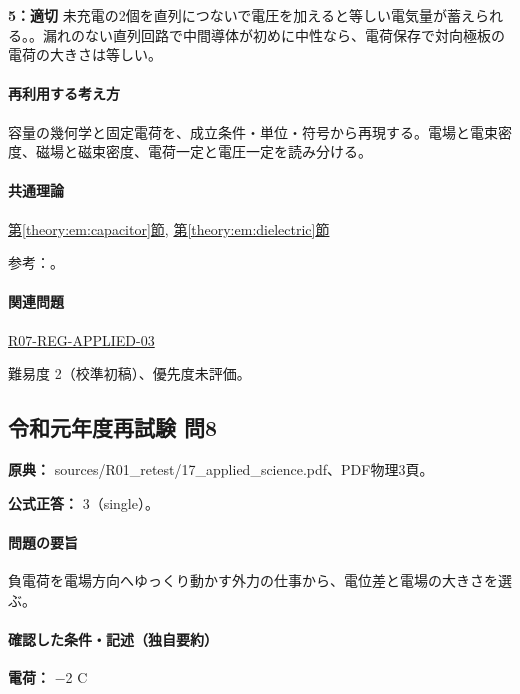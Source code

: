 \noindent\textbf{5：適切} 未充電の2個を直列につないで電圧を加えると等しい電気量が蓄えられる。。漏れのない直列回路で中間導体が初めに中性なら、電荷保存で対向極板の電荷の大きさは等しい。\par

\paragraph{再利用する考え方} 容量の幾何学と固定電荷を、成立条件・単位・符号から再現する。電場と電束密度、磁場と磁束密度、電荷一定と電圧一定を読み分ける。

\paragraph{共通理論} \hyperref[theory:em:capacitor]{第\ref*{theory:em:capacitor}節}, \hyperref[theory:em:dielectric]{第\ref*{theory:em:dielectric}節}

\par 参考：\cite{mit_em05}。

\paragraph{関連問題} \hyperref[q:r07-reg-applied-03]{R07-REG-APPLIED-03}

\par 難易度 2（校準初稿）、優先度未評価。

\subsection{令和元年度再試験 問8}
\label{q:r01-ret-applied-08}

\noindent\textbf{原典：} sources/R01\_retest/17\_applied\_science.pdf、PDF物理3頁。

\textbf{公式正答：} 3（single）。

\paragraph{問題の要旨} 負電荷を電場方向へゆっくり動かす外力の仕事から、電位差と電場の大きさを選ぶ。

\paragraph{確認した条件・記述（独自要約）}\mbox{}\par

\noindent\textbf{電荷：} −2 C\par

